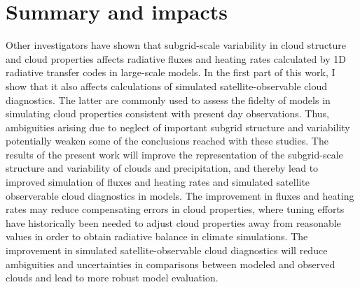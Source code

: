 \documentclass[letter]{article}
\begin{document}
\section{Summary and impacts}
Other investigators have shown that subgrid-scale variability in cloud structure and cloud properties affects radiative fluxes and heating rates calculated by 1D radiative transfer codes in large-scale models. In the first part of this work, I show that it also affects calculations of simulated satellite-observable cloud diagnostics. The latter are commonly used to assess the fidelty of models in simulating cloud properties consistent with present day observations. Thus, ambiguities arising due to neglect of important subgrid structure and variability potentially weaken some of the conclusions reached with these studies. The results of the present work will improve the representation of the subgrid-scale structure and variability of clouds and precipitation, and thereby lead to improved simulation of fluxes and heating rates and simulated satellite observerable cloud diagnostics in models. The improvement in fluxes and heating rates may reduce compensating errors in cloud properties, where tuning efforts have historically been needed to adjust cloud properties away from reasonable values in order to obtain radiative balance in climate simulations. The improvement in simulated satellite-observable cloud diagnostics will reduce ambiguities and uncertainties in comparisons between modeled and observed clouds and lead to more robust model evaluation.


\end{document}
